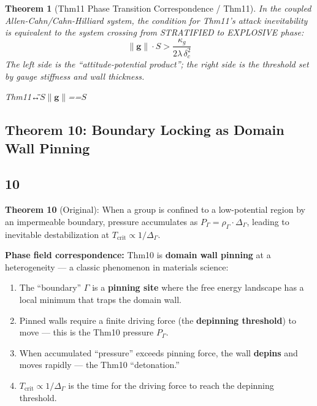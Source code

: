 \documentclass[12pt,a4paper]{article}
\theoremstyle{plain}
\newtheorem{theorem}{ Theorem}[section]
\theoremstyle{definition}
\newcommand{\gf}{\mathbf{g}}          %
\newcommand{\Sf}{S}                   %
\newcommand{\deltac}{\delta_c}        %
\newcommand{\cn}[1]{\textcolor{scxgray}{\textit{#1}}}
\begin{document}
\begin{theorem}[Thm11 Phase Transition Correspondence / Thm11]
\label{thm:thm11_phase}
In the coupled Allen-Cahn/Cahn-Hilliard system, the condition for Thm11's
attack inevitability is equivalent to the system crossing from STRATIFIED
to EXPLOSIVE phase:
\begin{equation}
    \|\gf\| \cdot \Sf > \frac{\kappa_g}{2\lambda\,\deltac^2}
    \label{eq:thm11_threshold}
\end{equation}
The left side is the ``attitude-potential product''; the right side is the
threshold set by gauge stiffness and wall thickness.
\end{theorem}

\bigskip
\noindent
\cn{Thm11↔\"\"$\Sf$$\|\gf\|$==$\Sf$}

\subsection{Theorem 10: Boundary Locking as Domain Wall Pinning}
\subsection*{10}

\textbf{Theorem 10} (Original): When a group is confined to a low-potential
region by an impermeable boundary, pressure accumulates as
$P_\Gamma = \rho_\Gamma\cdot\Delta_\Gamma$, leading to inevitable
destabilization at $T_{\text{crit}} \propto 1/\Delta_\Gamma$.

\textbf{Phase field correspondence:} Thm10 is \textbf{domain wall pinning}
at a heterogeneity — a classic phenomenon in materials science:

\begin{enumerate}[label=(\arabic*)]
    \item The ``boundary'' $\Gamma$ is a \textbf{pinning site} where the
          free energy landscape has a local minimum that traps the domain wall.
    \item Pinned walls require a finite driving force (the \textbf{depinning
          threshold}) to move — this is the Thm10 pressure $P_\Gamma$.
    \item When accumulated ``pressure'' exceeds pinning force, the wall
          \textbf{depins} and moves rapidly — the Thm10 ``detonation.''
    \item $T_{\text{crit}} \propto 1/\Delta_\Gamma$ is the time for the
          driving force to reach the depinning threshold.
\end{enumerate}
\end{document}
